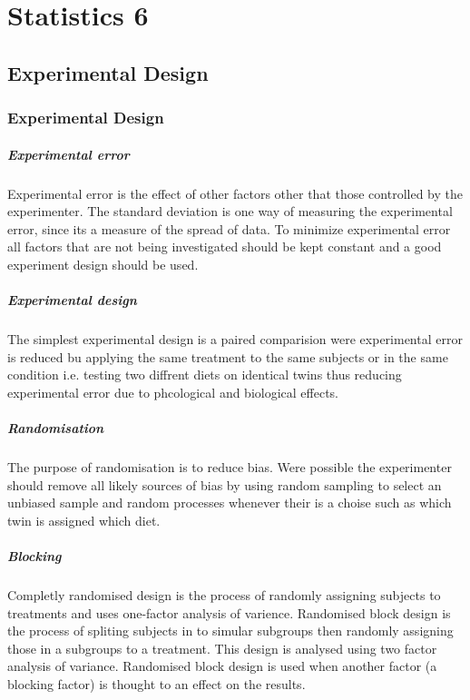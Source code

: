 \chapter*{Statistics 6}

\newpage
\section{Experimental Design}

    \newpage
    \subsection{Experimental Design}
        \paragraph{Experimental error}
        Experimental error is the effect of other factors other that those controlled by the experimenter. The standard deviation is one way of measuring the experimental error, since its a measure of the spread of data. To minimize experimental error all factors that are not being investigated should be kept constant and a good experiment design should be used.

        \paragraph{Experimental design}
        The simplest experimental design is a paired comparision were experimental error is reduced bu applying the same treatment to the same subjects or in the same condition i.e. testing two diffrent diets on identical twins thus reducing experimental error due to phcological and biological effects.

        \paragraph{Randomisation}
        The purpose of randomisation is to reduce bias. Were possible the experimenter should remove all likely sources of bias by using random sampling to select an unbiased sample and random processes whenever their is a choise such as which twin is assigned which diet. 

        \paragraph{Blocking}
        Completly randomised design is the process of randomly assigning subjects to treatments and uses one-factor analysis of varience. Randomised block design is the process of spliting subjects in to simular subgroups then randomly assigning those in a subgroups to a treatment. This design is analysed using two factor analysis of variance. Randomised block design is used when another factor (a blocking factor) is thought to an effect on the results. 

